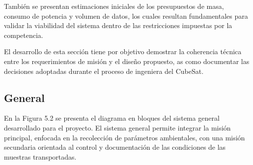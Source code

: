 También se presentan estimaciones iniciales de los presupuestos de masa, consumo de
potencia y volumen de datos, los cuales resultan fundamentales para validar la viabilidad del
sistema dentro de las restricciones impuestas por la competencia.

El desarrollo de esta sección tiene por objetivo demostrar la coherencia técnica entre los
requerimientos de misión y el diseño propuesto, as como documentar las decisiones adoptadas
durante el proceso de ingeniera del CubeSat.

  \subsection{General}
    En la Figura 5.2 se presenta el diagrama en bloques del sistema general desarrollado para
    el proyecto. El sistema general permite integrar la misión principal, enfocada en la recolección
    de parámetros ambientales, con una misión secundaria orientada al control y documentación de
    las condiciones de las muestras transportadas.

